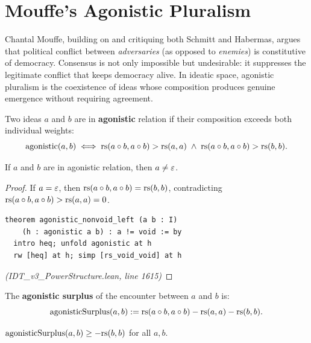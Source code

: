 \section{Mouffe's Agonistic Pluralism}

Chantal Mouffe, building on and critiquing both Schmitt and Habermas, argues
that political conflict between \emph{adversaries} (as opposed to
\emph{enemies}) is constitutive of democracy. Consensus is not only impossible
but undesirable: it suppresses the legitimate conflict that keeps democracy
alive. In ideatic space, agonistic pluralism is the coexistence of ideas
whose composition produces genuine emergence without requiring agreement.

\begin{definition}
\label{def:agonistic}
Two ideas $a$ and $b$ are in \textbf{agonistic} relation if their composition
exceeds both individual weights:
\[
  \mathrm{agonistic}(a, b) \iff \mathrm{rs}(a \circ b, a \circ b) > \mathrm{rs}(a,a) \;\land\; \mathrm{rs}(a \circ b, a \circ b) > \mathrm{rs}(b,b).
\]
\end{definition}

\begin{theorem}
\label{thm:agonistic-nonvoid}
If $a$ and $b$ are in agonistic relation, then $a \neq \varepsilon$.
\end{theorem}

\begin{proof}
If $a = \varepsilon$, then $\mathrm{rs}(a \circ b, a \circ b) = \mathrm{rs}(b,b)$, contradicting
$\mathrm{rs}(a \circ b, a \circ b) > \mathrm{rs}(a,a) = 0$.
\begin{lstlisting}
theorem agonistic_nonvoid_left (a b : I)
    (h : agonistic a b) : a != void := by
  intro heq; unfold agonistic at h
  rw [heq] at h; simp [rs_void_void] at h
\end{lstlisting}
\textit{(IDT\_v3\_PowerStructure.lean, line 1615)}
\end{proof}

\begin{definition}
\label{def:agonistic-surplus}
The \textbf{agonistic surplus} of the encounter between $a$ and $b$ is:
\[
  \mathrm{agonisticSurplus}(a, b) := \mathrm{rs}(a \circ b, a \circ b) - \mathrm{rs}(a,a) - \mathrm{rs}(b,b).
\]
\end{definition}

\begin{theorem}
\label{thm:agonistic-surplus-bound}
$\mathrm{agonisticSurplus}(a, b) \geq -\mathrm{rs}(b,b)$ for all $a, b$.
\end{theorem}

